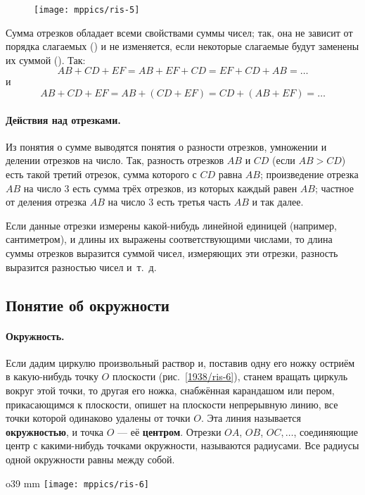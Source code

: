 \begin{figure}[h!]
\centering
\texttt{[image: mppics/ris-5]}
\caption{}\label{1938/ris-5}
\end{figure}

Сумма отрезков обладает всеми свойствами суммы чисел;
так, она не зависит от порядка слагаемых () и не изменяется, если некоторые слагаемые будут заменены их суммой ().
Так:
\[AB+CD+EF=AB+EF+CD=EF+CD+AB=\dots\]
и
\[AB+CD+EF=AB+(CD+EF)=CD+(AB+EF)=\dots\]

\paragraph{Действия над отрезками.}\label{1938/8}
Из понятия о сумме выводятся понятия о разности отрезков, умножении и делении отрезков на число.
Так, разность отрезков $AB$ и $CD$ (если $AB>CD$) есть такой третий отрезок, сумма которого с $CD$ равна $AB$;
произведение отрезка $AB$ на число $3$ есть сумма трёх отрезков, из которых каждый равен $AB$;
частное от деления отрезка $AB$ на число $3$ есть третья часть $AB$ и так далее.

Если данные отрезки измерены какой-нибудь линейной единицей (например, сантиметром), и длины их выражены соответствующими числами, то длина суммы отрезков выразится суммой чисел, измеряющих эти отрезки, разность выразится разностью чисел и~т.~д.

\subsection*{Понятие об окружности}

\paragraph{Окружность.}\label{1938/9}
Если дадим циркулю произвольный раствор и, поставив одну его ножку остриём в какую-нибудь точку $O$ плоскости (рис.~\ref{1938/ris-6}), станем вращать циркуль вокруг этой точки, то другая его ножка, снабжённая карандашом или пером, прикасающимся к плоскости, опишет на плоскости непрерывную линию, все точки которой одинаково удалены от точки $O$.
Эта линия называется \textbf{окружностью}, и точка $O$ — её \textbf{центром}.
Отрезки $OA$, $OB$, $OC,\dots$, соединяющие центр с какими-нибудь точками окружности, называются радиусами.
Все радиусы одной окружности равны между собой.

\begin{wrapfigure}{o}{39 mm}
\centering
\texttt{[image: mppics/ris-6]}
\caption{}\label{1938/ris-6}
\end{wrapfigure}

